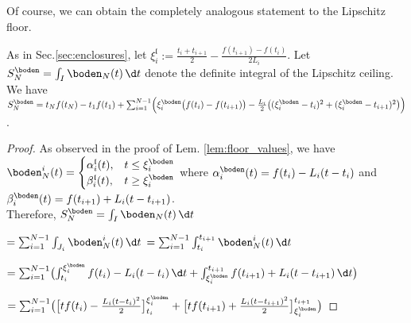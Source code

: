 Of course, we can obtain the completely analogous statement to the Lipschitz floor. 


\begin{thm} \label{thm:quad_ceiling} As in Sec.\ref{sec:enclosures}, let $\xi^{\mathfrak l}_i := \frac{t_i+t_{i+1}}{2} - \frac{f(t_{i+1}) - f(t_i)}{2 L_i}  $. Let $S^\boden_N = \int_I \boden_N (t) \, \d t$ denote the definite integral of the Lipschitz ceiling.
We have 
$S^\boden_N=t_N f(t_N) - t_1 f(t_1)+  \sum_{i=1}^{N-1} \Bigl(\xi^\boden_{i} \bigl( f(t_i) - f(t_{i+1})\bigr) - \frac{L_i}{2} \bigl( (\xi^\boden_{i}-t_i )^2 + (\xi^\boden_{i} -t_{i+1})^2 \bigr) 
 \Bigr) $. 


%

\begin{proof} As observed in the proof of Lem. \ref{lem:floor_values}, we have 
 $\boden_N^i(t) = 
 \begin{cases}  
 \alpha_i^{\mathfrak l} (t), & t \leq \xi_i^\boden \\
 \beta_i^{\mathfrak l} (t), & t \geq \xi_i^\boden
 \end{cases}$ 
% 
 where $\alpha^\boden_i( t) = f(t_i) - L_i (t - t_i)$ and $\beta^\boden_i( t) =
f(t_{i+1}) +L_i (t - t_{i+1})$.\\

Therefore,
$S^\boden_N = \int_I \boden_N (t) \, \d t$
 
 $= \sum_{i=1}^{N-1} \int_{J_i} \boden_N^i (t) \, \d t$
  $= \sum_{i=1}^{N-1} \int_{t_i}^{t_{i+1}} \boden_N^i (t) \, \d t$
  
  $= \sum_{i=1}^{N-1} \bigl( \int_{t_i}^{\xi^\boden_{i}}  f(t_i) - L_i (t - t_i) \, \d t + \int_{\xi^\boden_{i}}^{t_{i+1}}   f(t_{i+1}) +L_i (t - t_{i+1})\, \d t \bigr)$
  
  $= \sum_{i=1}^{N-1} \bigl( \bigl[t f(t_i) - \frac{L_i (t-t_i )^2}{2}\bigr]_{t_i}^{\xi^\boden_{i}}  + \bigl[t f(t_{i+1}) + \frac{L_i (t -t_{i+1})^2}{2}\bigr]^{t_{i+1}}_{\xi^\boden_{i}} \bigr)$
  

\end{proof}
\end{thm}

